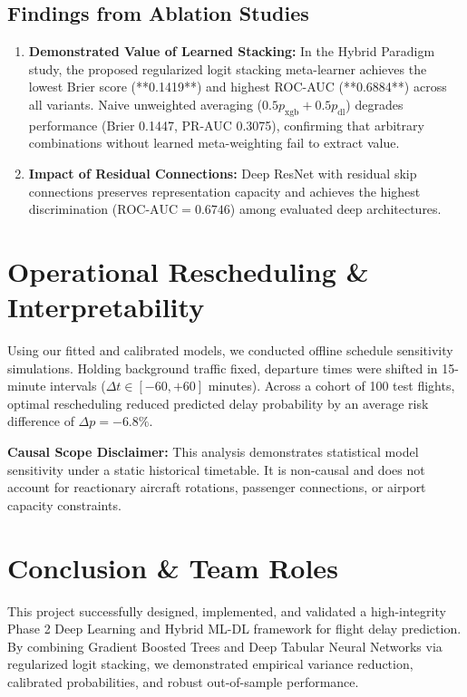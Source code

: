 \documentclass[conference]{IEEEtran}
\begin{document}
\subsection{Findings from Ablation Studies}
\begin{enumerate}
    \item \textbf{Demonstrated Value of Learned Stacking:} In the Hybrid Paradigm study, the proposed regularized logit stacking meta-learner achieves the lowest Brier score (**0.1419**) and highest ROC-AUC (**0.6884**) across all variants. Naive unweighted averaging ($0.5 p_{\text{xgb}} + 0.5 p_{\text{dl}}$) degrades performance (Brier 0.1447, PR-AUC 0.3075), confirming that arbitrary combinations without learned meta-weighting fail to extract value.
    \item \textbf{Impact of Residual Connections:} Deep ResNet with residual skip connections preserves representation capacity and achieves the highest discrimination ($\text{ROC-AUC} = 0.6746$) among evaluated deep architectures.
\end{enumerate}

\section{Operational Rescheduling \& Interpretability}
Using our fitted and calibrated models, we conducted offline schedule sensitivity simulations. Holding background traffic fixed, departure times were shifted in 15-minute intervals ($\Delta t \in [-60, +60]$ minutes). Across a cohort of 100 test flights, optimal rescheduling reduced predicted delay probability by an average risk difference of $\Delta p = -6.8\%$. 

\noindent \textbf{Causal Scope Disclaimer:} This analysis demonstrates statistical model sensitivity under a static historical timetable. It is non-causal and does not account for reactionary aircraft rotations, passenger connections, or airport capacity constraints.

\section{Conclusion \& Team Roles}
This project successfully designed, implemented, and validated a high-integrity Phase 2 Deep Learning and Hybrid ML-DL framework for flight delay prediction. By combining Gradient Boosted Trees and Deep Tabular Neural Networks via regularized logit stacking, we demonstrated empirical variance reduction, calibrated probabilities, and robust out-of-sample performance.
\end{document}
